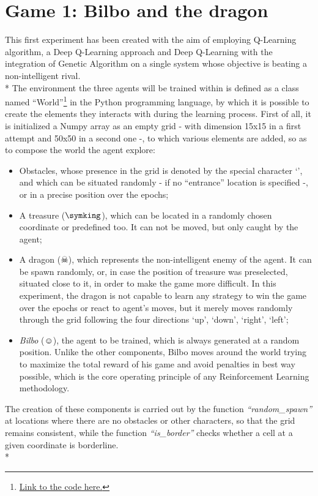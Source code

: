 \section{Game 1: Bilbo and the dragon}
This first experiment has been created with the aim of employing Q-Learning algorithm, a Deep Q-Learning approach and Deep Q-Learning with the integration of Genetic Algorithm on a single system whose objective is beating a non-intelligent rival.\\*
The environment the three agents will be trained within is defined as a class named ``World''\footnote{\href{https://github.com/moiraghif/DragonHunting/blob/master/Bilbo\%20World/CreateBilboWorld.py}{Link to the code here.}} in the Python programming language, by which it is possible to create the elements they interacts with during the learning process. First of all, it is initialized a Numpy array as an empty grid - with dimension 15x15 in a first attempt and 50x50 in a second one -, to which various elements are added, so as to compose the world the agent explore:
\begin{itemize}[noitemsep, topsep=0ex]
  \item Obstacles, whose presence in the grid is denoted by the special character `', and which can be situated randomly - if no ``entrance'' location is specified -, or in a precise position over the epochs;
  \item A treasure ($\symking$), which can be located in a randomly chosen coordinate or predefined too. It can not be moved, but only caught by the agent;
  \item A dragon ($\skull$), which represents the non-intelligent enemy of the agent. It can be spawn randomly, or, in case the position of treasure was preselected, situated close to it, in order to make the game more difficult. In this experiment, the dragon is not capable to learn any strategy to win the game over the epochs or react to agent's moves, but it merely moves randomly through the grid following the four directions `up', `down', `right', `left';
  \item \textit{Bilbo} ($\smiley$), the agent to be trained, which is always generated at a random position. Unlike the other components, Bilbo moves around the world trying to maximize the total reward of his game and avoid penalties in best way possible, which is the core operating principle of any Reinforcement Learning methodology.
\end{itemize}
The creation of these components is carried out by the function \textit{``random\_spawn''} at locations where there are no obstacles or other characters, so that the grid remains consistent, while the function \textit{``is\_border''} checks whether a cell at a given coordinate is borderline.\\*
